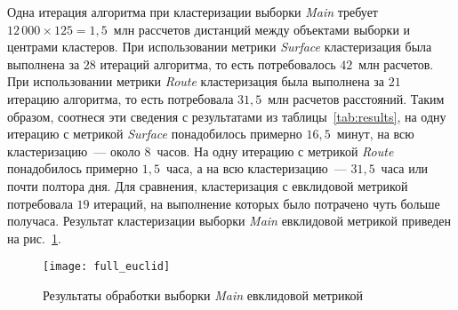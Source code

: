 Одна итерация алгоритма при кластеризации выборки \emph{Main} требует \( 12\,000 \times 125 = 1,\!5 \)~млн рассчетов дистанций между объектами выборки и центрами кластеров. При использовании метрики \emph{Surface} кластеризация была выполнена за \( 28 \) итераций алгоритма, то есть потребовалось \( 42 \)~млн расчетов. При использовании метрики \emph{Route} кластеризация была выполнена за \( 21 \) итерацию алгоритма, то есть потребовала \( 31,\!5 \)~млн расчетов расстояний. Таким образом, соотнеся эти сведения с результатами из таблицы~\ref{tab:results}, на одну итерацию с метрикой \emph{Surface} понадобилось примерно \( 16,\!5 \)~минут, на всю кластеризацию~--- около \( 8 \)~часов. На одну итерацию с метрикой \emph{Route} понадобилось примерно \( 1,\!5 \)~часа, а на всю кластеризацию~--- \( 31,\!5 \)~часа или почти полтора дня. Для сравнения, кластеризация с евклидовой метрикой потребовала \( 19 \) итераций, на выполнение которых было потрачено чуть больше получаса. Результат кластеризации выборки \emph{Main} евклидовой метрикой приведен на рис.~\ref{pic:full-euclid}.
\begin{figure}[h!]
    \centering
    \texttt{[image: full\_euclid]} \\[1ex]
    \parbox{.9\textwidth}{\caption{Результаты обработки выборки \emph{Main} евклидовой метрикой}\label{pic:full-euclid}}
    \vspace*{-1em}
\end{figure}
